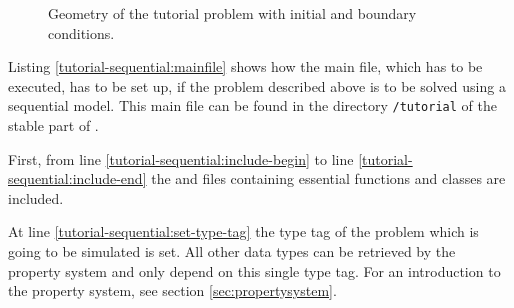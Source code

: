 \begin{figure}[ht]
\centering
{}
\caption{Geometry of the tutorial problem with initial and boundary conditions.}
\label{tutorial-sequential:problemfigure}
\end{figure}

Listing \ref{tutorial-sequential:mainfile} shows how the main file, which has to be
executed, has to be set up, if the problem described above is to be solved using
a sequential model. This main file can be found in the directory \texttt{/tutorial}
of the stable part of \Dumux.

\begin{lst}\label{tutorial-sequential:mainfile} \mbox{}

\end{lst}

First, from line \ref{tutorial-sequential:include-begin} to line
\ref{tutorial-sequential:include-end} the \Dune and \Dumux files containing
essential functions and classes are included.

At line \ref{tutorial-sequential:set-type-tag} the type tag of the
problem which is going to be simulated is set. All other data types
can be retrieved by the \Dumux property system and only depend on this
single type tag. For an introduction to the
property system, see section \ref{sec:propertysystem}.

